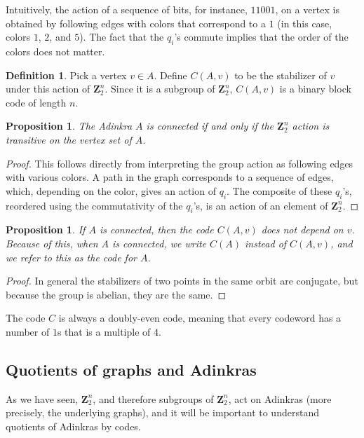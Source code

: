 \documentclass[12pt,twoside,singlespace]{article}
\numberwithin{equation}{section}
\newtheorem{prop}[equation]{Proposition}
\theoremstyle{definition}
\newtheorem{definition}[equation]{Definition}
\newcommand{\ZZ}{\mathbf{Z}}
\begin{document}
Intuitively, the action of a sequence of bits, for instance, $11001$, on a vertex is obtained by following edges with colors that correspond to a $1$ (in this case, colors $1$, $2$, and $5$).  The fact that the $q_i$'s commute implies that the order of the colors does not matter.



\begin{definition}
Pick a vertex $v\in A$.  Define $C(A,v)$ to be the stabilizer of $v$ under this action of $\ZZ_2^n$.  Since it is a subgroup of $\ZZ_2^n$, $C(A,v)$ is a binary block code of length $n$.
\end{definition}

\begin{prop}
\label{prop:transitive}
The Adinkra $A$ is connected if and only if the $\ZZ_2^n$ action is transitive on the vertex set of $A$.
\end{prop}
\begin{proof}
This follows directly from interpreting the group action as following edges with various colors.  A path in the graph corresponds to a sequence of edges, which, depending on the color, gives an action of $q_i$.  The composite of these $q_i$'s, reordered using the commutativity of the $q_i$'s, is an action of an element of $\ZZ_2^n$.

\end{proof}

\begin{prop}
If $A$ is connected, then the code $C(A,v)$ does not depend on $v$.  Because of this, when $A$ is connected, we write $C(A)$ instead of $C(A,v)$, and we refer to this as the \emph{code} for $A$.
\end{prop}
\begin{proof}
In general the stabilizers of two points in the same orbit are conjugate, but because the group is abelian, they are the same.
\end{proof}

The code $C$ is always a doubly-even code\cite{d2l:omni,d2l:decodes}, meaning that every codeword has a number of $1$s that is a multiple of $4$.

\subsection{Quotients of graphs and Adinkras}
\label{sec:quotient}
As we have seen, $\ZZ_2^n$, and therefore subgroups of $\ZZ_2^n$, act on Adinkras (more precisely, the underlying graphs), and it will be important to understand quotients of Adinkras by codes.
\end{document}
